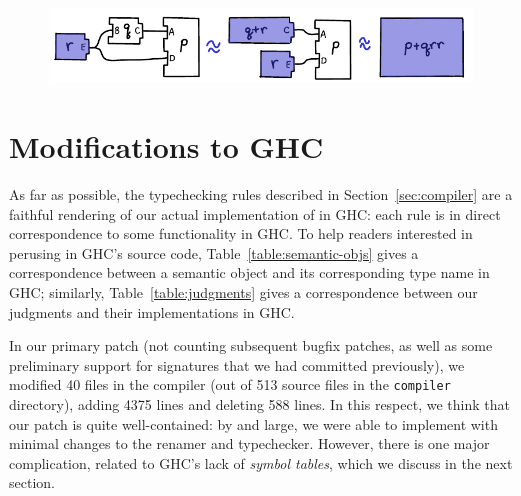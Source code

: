 \begin{figure}[H]
\center\includegraphics{figures/unit-identifier-improvement.pdf}
\end{figure}

\section{Modifications to GHC}

As far as possible, the typechecking rules described in
Section~\ref{sec:compiler} are a faithful rendering of our
actual implementation of \Backpack{} in GHC\@: each rule
is in direct correspondence to some functionality in
GHC\@.  To help readers interested in perusing \Backpack{} in GHC's
source code, Table~\ref{table:semantic-objs} gives a correspondence
between a semantic object and its corresponding type name in GHC\@;
similarly, Table~\ref{table:judgments} gives a correspondence between
our judgments and their implementations in GHC\@.

In our primary \Backpack{} patch (not counting subsequent bugfix
patches, as well as some preliminary support for signatures that we had
committed previously), we modified 40 files in the compiler (out of 513
source files in the \verb|compiler| directory), adding 4375 lines and
deleting 588 lines.  In this respect, we think that our \Backpack{}
patch is quite well-contained: by and large, we were able to implement
\Backpack{} with minimal changes to the renamer and typechecker.
However, there is one major complication, related to GHC's lack
of \emph{symbol tables}, which we discuss in the next section.

